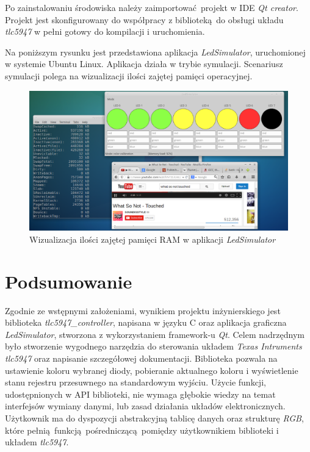\documentclass[eng,printmode]{mgr}
\begin{document}
Po zainstalowaniu środowiska należy zaimportować projekt w IDE \emph{Qt creator}. Projekt jest skonfigurowany do współpracy z biblioteką do obsługi układu \emph{tlc5947} w pełni gotowy do kompilacji i uruchomienia.

Na poniższym rysunku jest przedstawiona aplikacja \emph{LedSimulator}, uruchomionej w systemie Ubuntu Linux. Aplikacja działa w trybie symulacji. Scenariusz symulacji polega na wizualizacji ilości zajętej pamięci operacyjnej.

\begin{figure}[!ht]
    \centering
    \includegraphics[width=\textwidth]{Figures/ledSimulatorLinux.png} 
    \caption{Wizualizacja ilości zajętej pamięci RAM w aplikacji \emph{LedSimulator}}
    \label{fig:ledSimulatorLinux}
\end{figure}




\chapter*{Podsumowanie}

Zgodnie ze wstępnymi założeniami, wynikiem projektu inżynierskiego jest biblioteka \emph{tlc5947\_controller}, napisana w języku C oraz aplikacja graficzna \emph{LedSimulator}, stworzona z wykorzystaniem framework-u \emph{Qt}. Celem nadrzędnym było stworzenie wygodnego narzędzia do sterowania układem \emph{Texas Intruments tlc5947} oraz napisanie szczegółowej dokumentacji. Biblioteka pozwala na ustawienie koloru wybranej diody, pobieranie aktualnego koloru i wyświetlenie stanu rejestru przesuwnego na standardowym wyjściu. Użycie funkcji, udostępnionych w API biblioteki, nie wymaga głębokie wiedzy na temat interfejsów wymiany danymi, lub zasad działania układów elektronicznych. Użytkownik ma do dyspozycji abstrakcyjną tablicę danych oraz strukturę \emph{RGB}, które pełnią funkcją pośredniczącą pomiędzy użytkownikiem biblioteki i układem \emph{tlc5947}. 
\end{document}
